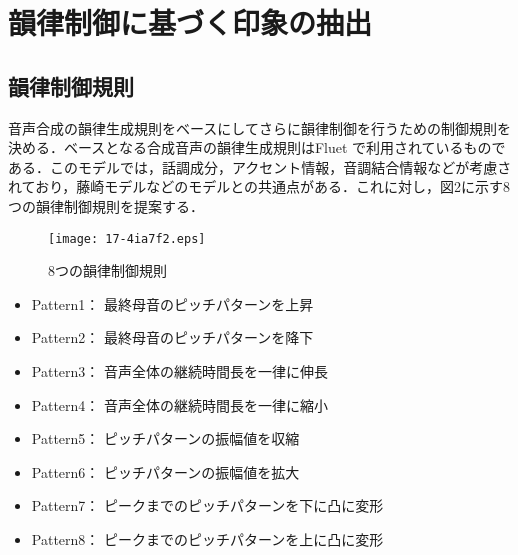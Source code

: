 \documentclass[japanese]{jnlp_1.4}
\begin{document}
\section{韻律制御に基づく印象の抽出}

\subsection{韻律制御規則}

音声合成の韻律生成規則をベースにしてさらに韻律制御を行うための制御規則を決める．ベースとなる合成音声の韻律生成規則はFluet \cite{Hakoda,FLUET}で利用されているものである．このモデルでは，話調成分，アクセント情報，音調結合情報などが考慮されており，藤崎モデル\cite{Fujisaki}などのモデルとの共通点がある．これに対し，図2に示す8つの韻律制御規則を提案する．


\begin{figure}[t]
\begin{center}
    \texttt{[image: 17-4ia7f2.eps]}
\end{center}
    \caption{8つの韻律制御規則}
\end{figure}

\begin{itemize}
\item Pattern1： 最終母音のピッチパターンを上昇
\item Pattern2： 最終母音のピッチパターンを降下
\item Pattern3： 音声全体の継続時間長を一律に伸長
\item Pattern4： 音声全体の継続時間長を一律に縮小
\item Pattern5： ピッチパターンの振幅値を収縮
\item Pattern6： ピッチパターンの振幅値を拡大
\item Pattern7： ピークまでのピッチパターンを下に凸に変形
\item Pattern8： ピークまでのピッチパターンを上に凸に変形
\end{itemize}
\end{document}
